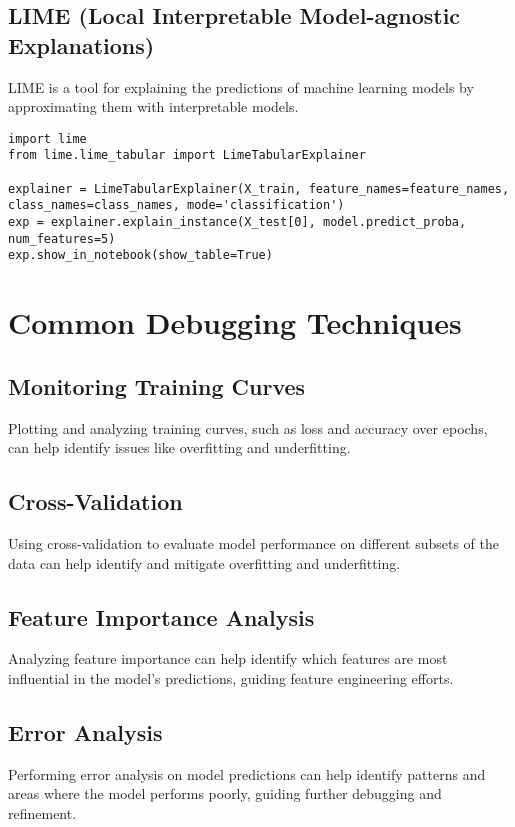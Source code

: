 \subsection{LIME (Local Interpretable Model-agnostic Explanations)}
LIME is a tool for explaining the predictions of machine learning models by approximating them with interpretable models.

\begin{verbatim}
import lime
from lime.lime_tabular import LimeTabularExplainer

explainer = LimeTabularExplainer(X_train, feature_names=feature_names, class_names=class_names, mode='classification')
exp = explainer.explain_instance(X_test[0], model.predict_proba, num_features=5)
exp.show_in_notebook(show_table=True)
\end{verbatim}

\section{Common Debugging Techniques}

\subsection{Monitoring Training Curves}
Plotting and analyzing training curves, such as loss and accuracy over epochs, can help identify issues like overfitting and underfitting.

\subsection{Cross-Validation}
Using cross-validation to evaluate model performance on different subsets of the data can help identify and mitigate overfitting and underfitting.

\subsection{Feature Importance Analysis}
Analyzing feature importance can help identify which features are most influential in the model's predictions, guiding feature engineering efforts.

\subsection{Error Analysis}
Performing error analysis on model predictions can help identify patterns and areas where the model performs poorly, guiding further debugging and refinement.


